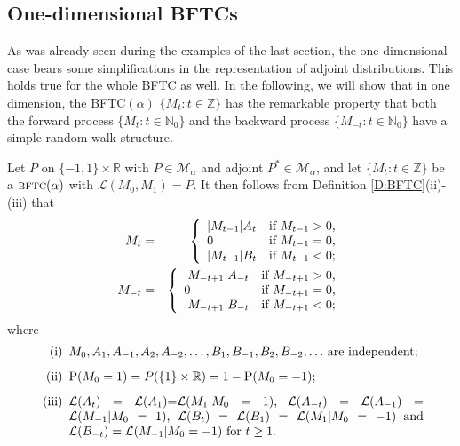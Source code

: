 \documentclass{aptpubarxiv}
\numberwithin{equation}{section}
\begin{document}
\iffalse
\subsection*{One-dimensional BFTCs}
As was already seen during the examples of the last section, the one-dimensional case bears some simplifications in the representation of adjoint distributions. This holds true for the whole BFTC as well. In the following, we will show that in one dimension, the BFTC$(\alpha)$ $\{M_t:t \in \mathbb{Z}\}$ has the remarkable property that both the forward process $\{M_t:t \in \mathbb{N}_0\}$ and the backward process $\{M_{-t}:t \in \mathbb{N}_0\}$ have a simple random walk structure. 

Let $P$ on $\{-1,1\}\times \mathbb{R}$ with $P \in {\mathcal{M}}_{\alpha}$ and adjoint $P^* \in {\mathcal{M}}_{\alpha}$, and let $\{M_t:t \in \mathbb{Z}\}$ be a ${\mbox{\sc bftc}}(\alpha)$ with $\mathcal{L}(M_0,M_1)=P$. It then follows from Definition \ref{D:BFTC}(ii)-(iii) that
\begin{eqnarray}
\label{E:BFTC:AB:1}
	M_t &=&
	\left\lbrace \begin{array}{l@{\quad}l}
		|M_{t-1}| A_t & \mbox{if $M_{t-1} > 0$,} \\
		0 & \mbox{if $M_{t-1} = 0$,} \\
		|M_{t-1}| B_t & \mbox{if $M_{t-1} < 0$;}
	\end{array} \right. \\*
	M_{-t} &=&
\label{E:BFTC:AB:2}	\left\lbrace \begin{array}{l@{\quad}l}
		|M_{-t+1}| A_{-t} & \mbox{if $M_{-t+1} > 0$,} \\
		0 & \mbox{if $M_{-t+1} = 0$,} \\
		|M_{-t+1}| B_{-t} & \mbox{if $M_{-t+1} < 0$;}
	\end{array} \right. \end{eqnarray}
where
\begin{equation}
\label{E:BFTC:AB:3}
\mbox{\begin{minipage}[h]{0.9\textwidth}
\begin{itemize}
\item[(i)] $M_0, A_1, A_{-1}, A_2, A_{-2}, \ldots, B_1, B_{-1}, B_2, B_{-2}, \ldots$ are independent;
\item[(ii)] ${\mathrm{P}}(M_0 = 1) = P(\{1\}\times\mathbb{R}) = 1 - {\mathrm{P}}(M_0 = -1)$;
\item[(iii)] ${\mathcal{L}}(A_t) = {\mathcal{L}}(A_1)$=${\mathcal{L}}(M_1|M_0=1)$, ${\mathcal{L}}(A_{-t}) = {\mathcal{L}}(A_{-1})={\mathcal{L}}(M_{-1}|M_0=1)$, ${\mathcal{L}}(B_t) = {\mathcal{L}}(B_1)={\mathcal{L}}(M_1|M_0=-1)$ and ${\mathcal{L}}(B_{-t}) = {\mathcal{L}}(M_{-1}|M_0=-1)$ for $t \geq 1$.
\end{itemize}
\end{minipage}}
\end{equation}
\end{document}
